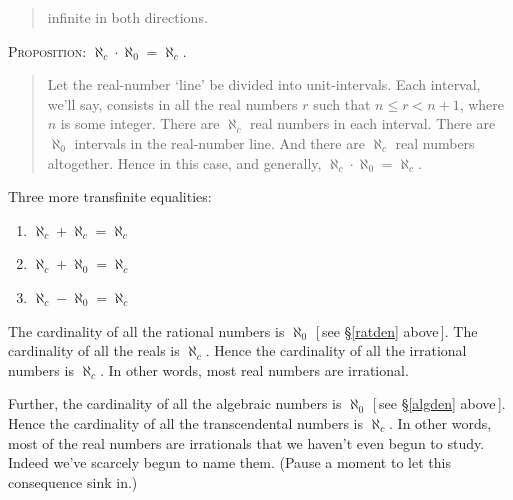 \documentclass[twoside,openright]{article}
\begin{document}
\begin{enumerate}
\begin{quote}
{infinite in both directions.  }\end{quote}
\textsc{Proposition}: $\aleph_{c}\cdot\aleph_{0}=\aleph_{c}.$
\begin{quote} {\small Let the real-number `line' be divided into
    unit-intervals. Each interval, we'll say, consists in all the real
    numbers $r$ such that $n\leq r< n+1$, where $n$ is some
    integer. There are $\aleph_{c}$ real numbers in each
    interval. There are $\aleph_{0}$ intervals in the real-number
    line. And there are $\aleph_{c}$ real numbers altogether. Hence in
    this case, and generally, $\aleph_{c}\cdot\aleph_{0}=\aleph_{c}.$}
\end{quote}
Three more transfinite equalities\label{alephc}:
\begin{enumerate}[(1)]
\item $\aleph_{c}+\aleph_{c}=\aleph_{c}$
\item $\aleph_{c}+\aleph_{0}=\aleph_{c}$
\item $\aleph_{c}-\aleph_{0}=\aleph_{c}$ \label{alphabetnum}
\end{enumerate}
The cardinality of all the rational numbers is $\aleph_{0}$ [\,see
\S\ref{ratden} above\,]. The cardinality of all the reals is
$\aleph_c$. Hence the cardinality of all the irrational numbers is
$\aleph_{c}$. In other words, most real numbers are irrational.

Further, the cardinality of all the algebraic numbers is $\aleph_{0}$
[\,see \S\ref{algden} above\,]. Hence the cardinality of all the
transcendental numbers is $\aleph_{c}$. \label{cardinalreals} In other
words, most of the real numbers are irrationals that we haven't even
begun to study. Indeed we've scarcely begun to name them. (Pause a
moment to let this consequence sink in.)


\end{enumerate}
\end{document}
